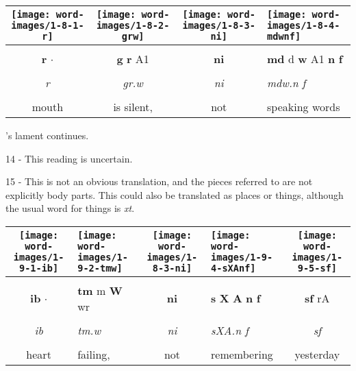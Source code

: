 \vspace{7.5mm}

\begin{tabularx}{\linewidth}{cccY}
	\texttt{[image: word-images/1-8-1-r]} &
	\texttt{[image: word-images/1-8-2-grw]} &
	\texttt{[image: word-images/1-8-3-ni]} &
	\texttt{[image: word-images/1-8-4-mdwnf]} \\
	\hline \\ 
	\textbf{r} $\cdot$ &
	\textbf{g} \textbf{r} A1 &
	\textbf{ni} &
	\textbf{md} d \textbf{w} A1 \textbf{n} \textbf{f} \\
	\hline \\ 
	\textit{r} & \textit{gr.w} & \textit{ni} & \textit{mdw.n f} \\
	\hline \\ 
	mouth & is silent, & not & speaking words
\end{tabularx}

\vspace*{\fill}

\pagebreak

\vspace*{\fill}

's lament continues.

\vspace*{\fill}

14 - This reading is uncertain.

15 - This is not an obvious translation, and the pieces referred to are not explicitly body parts. This could also be translated as places or things, although the usual word for things is \textit{xt}.

\vspace*{\fill}

\pagebreak


\vspace*{\fill}

\begin{tabularx}{\linewidth}{cYcYc}
	\texttt{[image: word-images/1-9-1-ib]} &
	\texttt{[image: word-images/1-9-2-tmw]} &
	\hspace{4mm}\texttt{[image: word-images/1-8-3-ni]} &
	\texttt{[image: word-images/1-9-4-sXAnf]} &
	\texttt{[image: word-images/1-9-5-sf]} \\
	\hline \\ 
	\textbf{ib} $\cdot$ &
	\textbf{tm} m \textbf{W} wr &
	\hspace{4mm}\textbf{ni} &
	\textbf{s} \textbf{X} \textbf{A} \textbf{n} \textbf{f} &
	\textbf{sf} rA \\
	\hline \\ 
	\textit{ib} & \textit{tm.w} & \hspace{4mm}\textit{ni} & \textit{sXA.n f} & \textit{sf} \\
	\hline \\ 
	heart & failing, & \hspace{3mm}not & remembering & yesterday
\end{tabularx}

